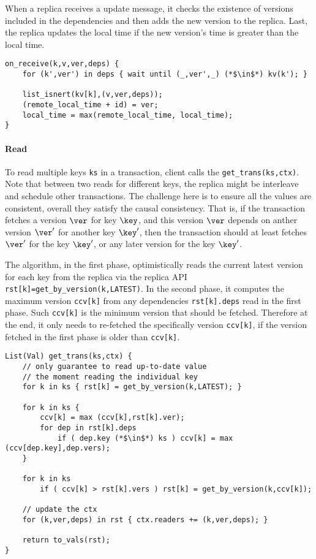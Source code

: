 When a replica receives a update message, it checks the existence of versions included in the dependencies and then adds the new version to the replica.
Last, the replica updates the local time if the new version's time is greater than the local time.


\begin{lstlisting}[caption={Receive update message},label={lst:cops-replica-receive-msg}]
on_receive(k,v,ver,deps) {
    for (k',ver') in deps { wait until (_,ver',_) (*$\in$*) kv(k'); }

    list_isnert(kv[k],(v,ver,deps));
    (remote_local_time + id) = ver;
    local_time = max(remote_local_time, local_time);
}
\end{lstlisting}


\paragraph{\bf Read}
To read multiple keys \verb|ks| in a transaction, client calls the \verb|get_trans(ks,ctx)|.
Note that between two reads for different keys, 
the replica might be interleave and schedule other transactions.
The challenge here is to ensure all the values are consistent, \ie
overall they satisfy the causal consistency.
That is, if the transaction fetches a version \( \ver \) for key \( \key \),
and this version \( \ver \) depends on anther version \( \ver' \) for another key \( \key' \), 
then the transaction should at least fetches \( \ver' \) for the key \( \key' \),
or any later version  for the key \( \key' \).

The algorithm, in the first phase, optimistically reads the current latest version for each key from the replica via the replica API \verb|rst[k]=get_by_version(k,LATEST)|.
In the second phase, it computes the maximum version \verb|ccv[k]| from any dependencies \verb|rst[k].deps| read in the first phase.
Such \verb|ccv[k]| is the minimum version that should be fetched.
Therefore at the end, it only needs to re-fetched the specifically version \verb|ccv[k]|,
if the version fetched in the first phase is older than \verb|ccv[k]|.

\begin{lstlisting}[caption={Reads},label={lst:cops-client-read}]
List(Val) get_trans(ks,ctx) {
    // only guarantee to read up-to-date value 
    // the moment reading the individual key
    for k in ks { rst[k] = get_by_version(k,LATEST); }

    for k in ks {
        ccv[k] = max (ccv[k],rst[k].ver);
        for dep in rst[k].deps
            if ( dep.key (*$\in$*) ks ) ccv[k] = max (ccv[dep.key],dep.vers);
    }

    for k in ks 
        if ( ccv[k] > rst[k].vers ) rst[k] = get_by_version(k,ccv[k]);

    // update the ctx
    for (k,ver,deps) in rst { ctx.readers += (k,ver,deps); }

    return to_vals(rst);
}                                   
\end{lstlisting}

